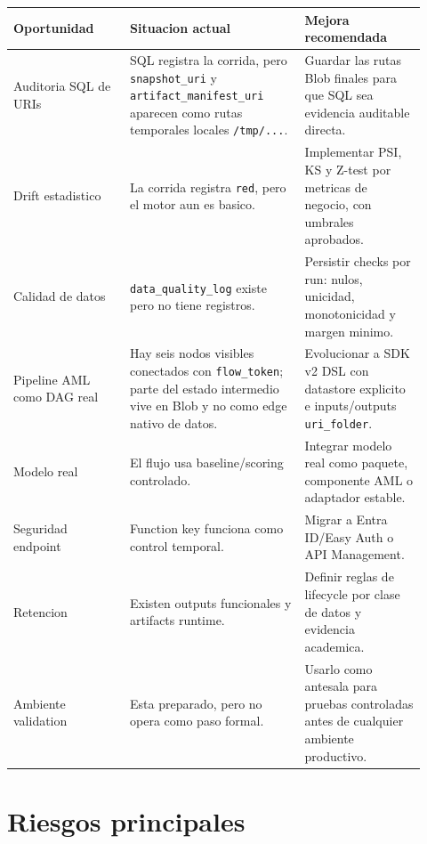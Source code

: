 \documentclass[11pt,letterpaper]{article}
\newcommand{\code}[1]{\texttt{\small #1}}
\begin{document}
\begin{longtable}{p{0.26\linewidth}p{0.39\linewidth}p{0.27\linewidth}}
\toprule
\textbf{Oportunidad} & \textbf{Situacion actual} & \textbf{Mejora recomendada}\\
\midrule
\endhead
Auditoria SQL de URIs & SQL registra la corrida, pero \code{snapshot\_uri} y \code{artifact\_manifest\_uri} aparecen como rutas temporales locales \code{/tmp/...}. & Guardar las rutas Blob finales para que SQL sea evidencia auditable directa.\\
Drift estadistico & La corrida registra \code{red}, pero el motor aun es basico. & Implementar PSI, KS y Z-test por metricas de negocio, con umbrales aprobados.\\
Calidad de datos & \code{data\_quality\_log} existe pero no tiene registros. & Persistir checks por run: nulos, unicidad, monotonicidad y margen minimo.\\
Pipeline AML como DAG real & Hay seis nodos visibles conectados con \code{flow\_token}; parte del estado intermedio vive en Blob y no como edge nativo de datos. & Evolucionar a SDK v2 DSL con datastore explicito e inputs/outputs \code{uri\_folder}.\\
Modelo real & El flujo usa baseline/scoring controlado. & Integrar modelo real como paquete, componente AML o adaptador estable.\\
Seguridad endpoint & Function key funciona como control temporal. & Migrar a Entra ID/Easy Auth o API Management.\\
Retencion & Existen outputs funcionales y artifacts runtime. & Definir reglas de lifecycle por clase de datos y evidencia academica.\\
Ambiente validation & Esta preparado, pero no opera como paso formal. & Usarlo como antesala para pruebas controladas antes de cualquier ambiente productivo.\\
\bottomrule
\end{longtable}

\section*{Riesgos principales}
\end{document}

